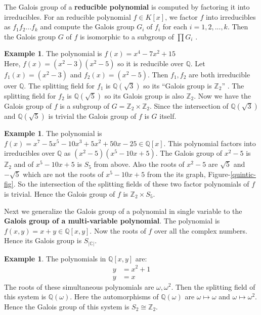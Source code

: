 \documentclass[a4paper,twoside,10pt]{article}
\theoremstyle{plain}
\theoremstyle{definition}
\newtheorem{example}[theorem]{Example}
\begin{document}
\noindent
The Galois group of a \textbf{reducible polynomial} is computed by factoring it into irreducibles. For an reducible polynomial \(f \in K[x]\), we factor \(f\) into irreducibles as \(f_1f_2...f_k\) and compute the Galois group \(G_i\)  of \(f_i\) for each \(i=1,2,...,k\). Then the Galois group \(G\) of \(f\) is isomorphic to a subgroup of \(\prod G_i\) \cite{algorithm}.

\begin{example}
  The polynomial is \(f(x) = x^4-7x^2+15\)\\
  Here, \(f(x)=(x^2-3)(x^2-5)\) so it is reducible over \(\mathbb{Q}\). Let \(f_1(x)=(x^2-3)\) and \(f_2(x)=(x^2-5)\). Then \(f_1,f_2\) are both irreducible over \(\mathbb{Q}\). The splitting field for \(f_1\) is \(\mathbb{Q}(\sqrt{3})\) so its ``Galois group is \({\mathbb{Z}}_2\)'' \cite{hunger}. The splitting field for \(f_2\) is \(\mathbb{Q}(\sqrt{5})\) so its Galois group is also \({\mathbb{Z}}_2\). Now we have the Galois group of \(f\) is a subgroup of \(G={\mathbb{Z}}_2 \times {\mathbb{Z}}_2\). Since the intersection of \(\mathbb{Q}(\sqrt{3})\) and \(\mathbb{Q}(\sqrt{5})\) is trivial the Galois group of \(f\) is \(G\) itself.
\end{example}

\begin{example}
  The polynomial is \(f(x)=x^7-5x^5-10x^3+5x^2+50x-25 \in \mathbb{Q}[x]\). This polynomial factors into irreducibles over \(\mathbb{Q}\) as \((x^2-5)(x^5-10x+5)\). The Galois group of \(x^2-5\) is \({\mathbb{Z}}_2\) \cite{algorithm} and of \(x^5-10x+5\) is \(S_5\) from above. Also the roots of \(x^2-5\) are \(\sqrt{5}\) and \(-\sqrt{5}\) which are not the roots of \(x^5-10x+5\) from the its graph, Figure-\ref{quintic-fig}. So the intersection of the splitting fields of these two factor polynomials of \(f\) is trivial. Hence the Galois group of \(f\) is \(\mathbb{Z}_2 \times S_5\).
\end{example}

\vspace{5mm}
\noindent
Next we generalize the Galois group of a polynomial in single variable to the \textbf{Galois group of a multi-variable polynomial}. The polynomial is \(f(x,y)=x+y \in \mathbb{Q}[x,y]\). Now the roots of \(f\) over all the complex numbers. Hence its Galois group is \(S_{|\mathbb{C}|}\).
\begin{example}
  The polynomials in \(\mathbb{Q}[x,y]\) are:
  \begin{align}
    y &= x^2+1 \\
    y &=x
  \end{align}
  The roots of these simultaneous polynomials are \(\omega, {\omega}^2\). Then the splitting field of this system is \(\mathbb{Q}(\omega)\). Here the automorphisms of \(\mathbb{Q}(\omega)\) are \(\omega \longmapsto \omega\) and \(\omega \longmapsto {\omega}^2\). Hence the Galois group of this system is \(S_2 \cong {\mathbb{Z}}_2\).
\end{example}
\end{document}
